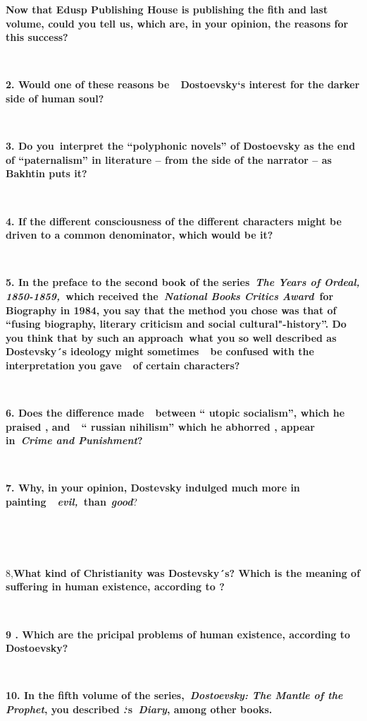 \textbf{Now that Edusp Publishing House is publishing the fith and last
volume, could you tell us, which are, in your opinion, the reasons for
this success?}

\textbf{~}

\textbf{2. Would one of these reasons be~~Dostoevsky`s interest for the
darker side of human soul?}

\textbf{~}

\textbf{3. Do you~interpret the ``polyphonic novels'' of Dostoevsky as
the end of ``paternalism'' in literature -- from the side of the
narrator -- as Bakhtin puts it?}

\textbf{~}

\textbf{4. If the different consciousness of the different characters
might be driven to a common denominator, which would be it?}

\textbf{~}

\textbf{5. In the preface to the second book of the series~\emph{The
Years of Ordeal, 1850-1859,~}which received the~\emph{National Books
Critics Award}~for Biography in 1984, you say that the method you chose
was that of ``fusing biography, literary criticism and social
cultural"-history''. Do you think that by such an approach~what you so
well described as Dostevsky´s ideology might sometimes~~be confused with
the interpretation you gave~~of certain characters?}

\textbf{~}

\textbf{6. Does the difference  made~~between `` utopic socialism'',
which he praised , and~~`` russian nihilism'' which he abhorred , appear
in~\emph{Crime and Punishment}?}

\textbf{~}

\textbf{7. Why, in your opinion, Dostevsky indulged much more in
painting~~\emph{evil,~}than}~\emph{\textbf{good}}?

~

~

8,\textbf{What kind of Christianity was Dostevsky´s? Which is the
meaning of suffering in human existence, according to ?}

\textbf{~}

\textbf{9 . Which are the pricipal problems of human existence,
according to Dostoevsky?}

\textbf{~}

\textbf{10. In the fifth volume of the series,~\emph{Dostoevsky: The
Mantle of the Prophet}, you described .`s\emph{~Diary}, among other
books.}

